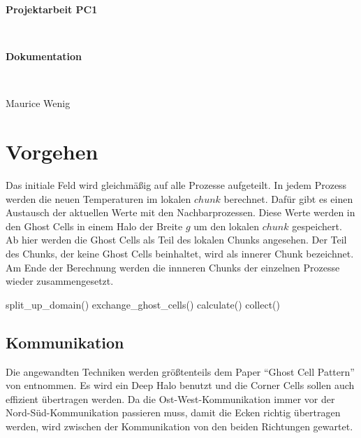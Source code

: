 \documentclass[12pt]{article}
\begin{document}
\thispagestyle{empty}
\begin{center}
    \begin{LARGE}
        \textbf{Projektarbeit PC1}
    \end{LARGE}\vspace{3mm}\\
    \begin{Large}
        \textbf{Dokumentation}
    \end{Large}\vspace{5mm}\\
    \begin{large}
        Maurice Wenig
    \end{large}
\end{center}
\tableofcontents
\clearpage

% 

\fancyhead[LO,RE]{\itshape\nouppercase\leftmark}
\section{Vorgehen}
Das initiale Feld wird gleichmäßig auf alle Prozesse aufgeteilt. In jedem Prozess werden die neuen Temperaturen im lokalen $chunk$ berechnet. Dafür gibt es einen Austausch der aktuellen Werte mit den Nachbarprozessen. Diese Werte werden in den Ghost Cells in einem Halo der Breite $g$ um den lokalen $chunk$ gespeichert.
Ab hier werden die Ghost Cells als Teil des lokalen Chunks angesehen. Der Teil des Chunks, der keine Ghost Cells beinhaltet, wird als innerer Chunk bezeichnet.
Am Ende der Berechnung werden die innneren Chunks der einzelnen Prozesse wieder zusammengesetzt.

\begin{algorithmic}[1]
    \State split\_up\_domain()
            \State exchange\_ghost\_cells()
        \EndIf
        \State calculate()
    \EndFor
    \State collect()
\end{algorithmic}
\subsection{Kommunikation}
Die angewandten Techniken werden größtenteils dem Paper ``Ghost Cell Pattern'' von \citeauthor{Kjolstad2010} entnommen.
Es wird ein Deep Halo benutzt und die Corner Cells sollen auch effizient übertragen werden.
Da die Ost-West-Kommunikation immer vor der Nord-Süd-Kommunikation passieren muss, damit die Ecken richtig übertragen werden, wird zwischen der Kommunikation von den beiden Richtungen gewartet.
\end{document}
